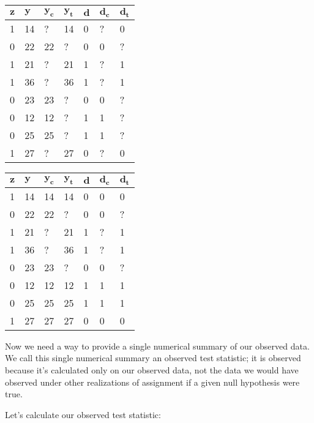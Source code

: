 \documentclass[11pt,leqno]{article}\usepackage[]{graphicx}\usepackage[]{color}
\theoremstyle{newstyle}
\begin{document}
\begin{table}[!hbt]
\centering
    \begin{tabular}{l|l|l|l|l|l|l}
    $\mathbf{z}$ & $\mathbf{y}$ & $\mathbf{y_c}$ & $\mathbf{y_t}$ & $\mathbf{d}$ & $\mathbf{d_c}$ & $\mathbf{d_t}$ \\ \hline
    1 & 14 & ? & 14 & 0 & ? & 0 \\
    0 & 22 & 22 & ? & 0 & 0 & ? \\
    1 & 21 & ? & 21 & 1 & ? & 1 \\
    1 & 36 & ? & 36 & 1 & ? & 1 \\
    0 & 23 & 23 & ? & 0 & 0 & ? \\
    0 & 12 & 12 & ? & 1 & 1 & ? \\
    0 & 25 & 25 & ? & 1 & 1 & ? \\
    1 & 27 & ?  & 27 & 0 & ? & 0\\
    \end{tabular}
    \hfill 
    \begin{tabular}{l|l|l|l|l|l|l}
    $\mathbf{z}$ & $\mathbf{y}$ & $\mathbf{y_c}$ & $\mathbf{y_t}$ & $\mathbf{d}$ & $\mathbf{d_c}$ & $\mathbf{d_t}$ \\ \hline
    1 & 14 & 14 & 14 & 0 & 0 & 0 \\
    0 & 22 & 22 & ? & 0 & 0 & ? \\
    1 & 21 & ? & 21 & 1 & ? & 1 \\
    1 & 36 & ? & 36 & 1 & ? & 1 \\
    0 & 23 & 23 & ? & 0 & 0 & ? \\
    0 & 12 & 12 & 12 & 1 & 1 & 1 \\
    0 & 25 & 25 & 25 & 1 & 1 & 1 \\
    1 & 27 & 27  & 27 & 0 & 0 & 0\\
    \end{tabular}    
\end{table}

Now we need a way to provide a single numerical summary of our observed data. We call this single numerical summary an observed test statistic; it is observed because it's calculated only on our observed data, not the data we would have observed under other realizations of assignment if a given null hypothesis were true.

Let's calculate our observed test statistic:
\end{document}
